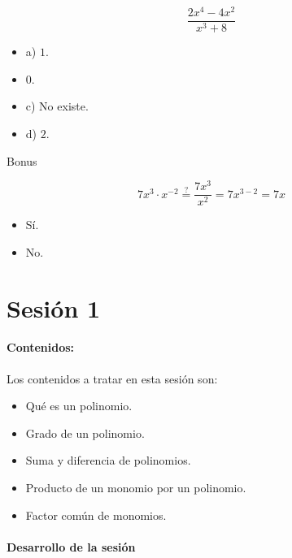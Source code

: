 \[
	\frac{2x^4-4x^2}{x^3+8}
\]

\begin{itemize}
	\item a) $1$.
	\item {} $0$.
	\item c) No existe.
	\item d) $2$.
\end{itemize}



\newbloq Bonus

\[
	7x^3·x^{-2} \overset{?}{=} \frac{7x^3}{x^2} = 7x^{3-2} = 7x
\]

\begin{itemize}
	\item {} Sí.
	\item No.
\end{itemize}




\section{Sesión 1}


\paragraph{Contenidos:}
Los contenidos a tratar en esta sesión son:
\begin{itemize}
\item Qué es un polinomio.
\item Grado de un polinomio.
\item Suma y diferencia de polinomios.
\item Producto de un monomio por un polinomio.
\item Factor común de monomios.
\end{itemize}


\paragraph{Desarrollo de la sesión} 

